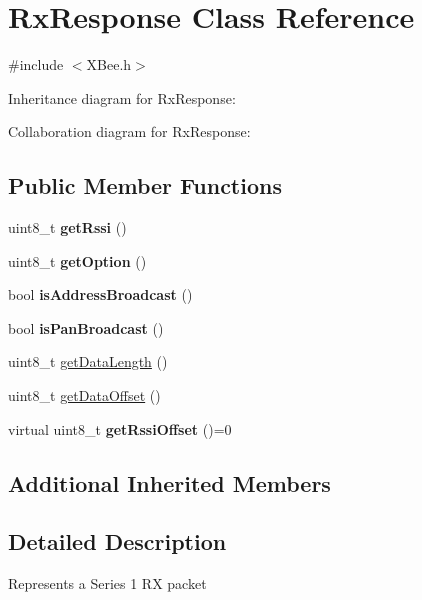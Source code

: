 \hypertarget{class_rx_response}{}\section{Rx\+Response Class Reference}
\label{class_rx_response}


{\ttfamily \#include $<$X\+Bee.\+h$>$}



Inheritance diagram for Rx\+Response\+:


Collaboration diagram for Rx\+Response\+:
\subsection*{Public Member Functions}
\begin{DoxyCompactItemize}
\item 
\hypertarget{class_rx_response_a43fa3b1d0f4df2491496d10d7981799e}{}\label{class_rx_response_a43fa3b1d0f4df2491496d10d7981799e} 
uint8\+\_\+t {\bfseries get\+Rssi} ()
\item 
\hypertarget{class_rx_response_a1bd75535804b6c1ff64a9ecd8aba6fcd}{}\label{class_rx_response_a1bd75535804b6c1ff64a9ecd8aba6fcd} 
uint8\+\_\+t {\bfseries get\+Option} ()
\item 
\hypertarget{class_rx_response_ac85e73bfa6656b2c96275101e6fdea6e}{}\label{class_rx_response_ac85e73bfa6656b2c96275101e6fdea6e} 
bool {\bfseries is\+Address\+Broadcast} ()
\item 
\hypertarget{class_rx_response_a1b492ad1ff869b00903efc4ff571a006}{}\label{class_rx_response_a1b492ad1ff869b00903efc4ff571a006} 
bool {\bfseries is\+Pan\+Broadcast} ()
\item 
uint8\+\_\+t \hyperlink{class_rx_response_add3478a1ce5667aad315f6a6c218011a}{get\+Data\+Length} ()
\item 
uint8\+\_\+t \hyperlink{class_rx_response_a37fd3ee455f2157fa3894e710e668409}{get\+Data\+Offset} ()
\item 
\hypertarget{class_rx_response_ac0e5dc8fc16aa3004b5c59a8a306e00e}{}\label{class_rx_response_ac0e5dc8fc16aa3004b5c59a8a306e00e} 
virtual uint8\+\_\+t {\bfseries get\+Rssi\+Offset} ()=0
\end{DoxyCompactItemize}
\subsection*{Additional Inherited Members}


\subsection{Detailed Description}
Represents a Series 1 RX packet 

